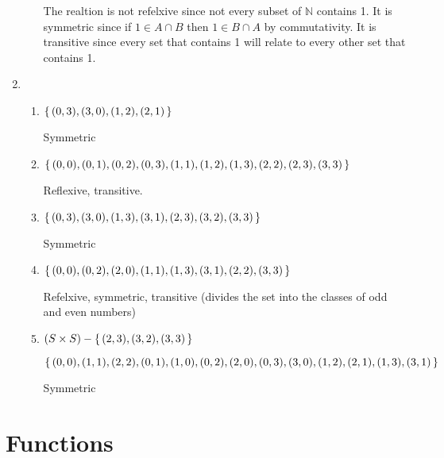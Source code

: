 \documentclass{article}
\begin{document}
\begin{enumerate}
\begin{enumerate}
                The realtion is not refelxive since not every subset of $\mathbb{N}$ contains 1. It is symmetric since if $1 \in A \cap B$ then $1 \in B \cap A$ by commutativity. It is transitive since every set that contains 1 will relate to every other set that contains 1.
        \end{enumerate}

    \item
        \begin{enumerate}
            \item $\set{(0,3),(3,0),(1,2),(2,1)}$

                Symmetric
            \item $\set{(0,0), (0,1), (0,2), (0,3), (1,1), (1,2), (1,3), (2,2), (2,3), (3,3)}$

                Reflexive, transitive.

            \item $\set{(0,3),(3,0), (1,3),(3,1), (2,3), (3,2), (3,3)}$

                Symmetric

            \item $\set{(0,0), (0,2), (2,0), (1,1), (1,3),(3,1), (2,2), (3,3)}$

                Refelxive, symmetric, transitive (divides the set into the classes of odd and even numbers)

            \item $(S \times S) - \set{(2,3), (3,2), (3,3)}$

                $$\set{(0,0), (1,1), (2,2), (0,1), (1,0), (0,2),(2,0), (0,3), (3,0), (1,2), (2,1), (1,3), (3,1)}$$

                Symmetric
        \end{enumerate}

\end{enumerate}

\section{Functions}
\end{document}

